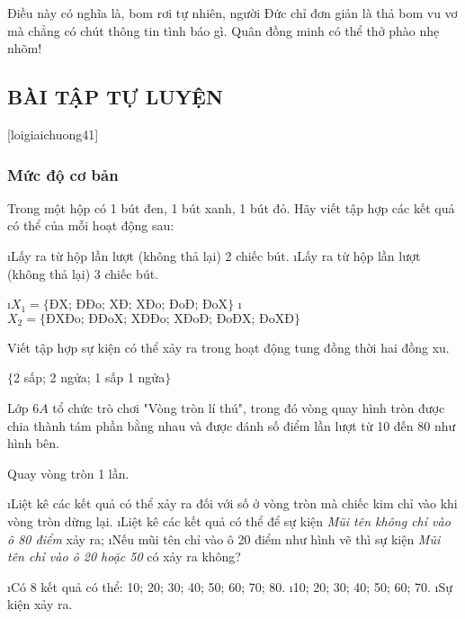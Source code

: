 Điều này có nghĩa là, bom rơi tự nhiên, người Đức chỉ đơn giản là thả bom vu vơ mà chẳng có chút thông tin tình báo gì. Quân đồng minh có thể thở phào nhẹ nhõm!
\subsection{BÀI TẬP TỰ LUYỆN}
[loigiaichuong41]
\subsubsection*{Mức độ cơ bản}
\begin{bt}
	Trong một hộp có 1 bút đen, 1 bút xanh, 1 bút đỏ. Hãy viết tập hợp các kết quả có thể của mỗi hoạt động sau: 
	\begin{enumerate}[a),leftmargin=*]
		\i Lấy ra từ hộp lần lượt (không thả lại) 2 chiếc bút.
		\i Lấy ra từ hộp lần lượt (không thả lại) 3 chiếc bút.
	\end{enumerate}
	\begin{loigiaichuong41}
		\begin{enumerate}[a),leftmargin=*]
			\i $X_1 = \{\text{ĐX; ĐĐo; XĐ; XĐo; ĐoĐ; ĐoX}\}$
			\i $X_2 = \{\text{ĐXĐo; ĐĐoX; XĐĐo; XĐoĐ; ĐoĐX; ĐoXĐ}\}$
		\end{enumerate}
	\end{loigiaichuong41}
\end{bt}
\begin{bt}
	Viết tập hợp sự kiện có thể xảy ra trong hoạt động tung đồng thời hai đồng xu.	
	\begin{loigiaichuong41}
	$\{$2 sấp; 2 ngửa; 1 sấp 1 ngửa$\}$
	\end{loigiaichuong41}
\end{bt}
\begin{bt}
	Lớp $6A$ tổ chức trò chơi "Vòng tròn lí thú", trong đó vòng quay hình tròn được chia thành tám phần bằng nhau và được đánh số điểm lần lượt từ 10 đến 80 như hình bên.
	
	Quay vòng tròn 1 lần.
	\begin{enumerate}[a),leftmargin=*]
		\i Liệt kê các kết quả có thể xảy ra đối với số ở vòng tròn mà chiếc kim chỉ vào khi vòng tròn dừng lại.
		\i Liệt kê các kết quả có thể để sự kiện \textit{Mũi tên không chỉ vào ô 80 điểm} xảy ra;
		\i Nếu mũi tên chỉ vào ô 20 điểm như hình vẽ thì sự kiện \textit{Mũi tên chỉ vào ô 20 hoặc 50} có xảy ra không?
	\end{enumerate}
	\begin{loigiaichuong41}
		\begin{enumerate}[a),leftmargin=*]
			\i Có 8 kết quả có thể: 10; 20; 30; 40; 50; 60; 70; 80.
			\i 10; 20; 30; 40; 50; 60; 70.
			\i Sự kiện xảy ra.
		\end{enumerate}
	\end{loigiaichuong41}
\end{bt}
